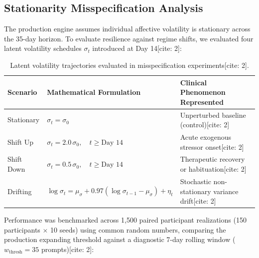 \documentclass[11pt,letterpaper]{article}
\begin{document}
\subsection{Stationarity Misspecification Analysis}

The production engine assumes individual affective volatility is stationary across the 35-day horizon. To evaluate resilience against regime shifts, we evaluated four latent volatility schedules $\sigma_t$ introduced at Day 14[cite: 2]:

\begin{table}[htbp]
\centering
\small
\begin{tabular}{@{}lll@{}}
\toprule
\textbf{Scenario} & \textbf{Mathematical Formulation} & \textbf{Clinical Phenomenon Represented} \\
\midrule
Stationary & $\sigma_t = \sigma_0$ & Unperturbed baseline (control)[cite: 2] \\
Shift Up & $\sigma_t = 2.0\,\sigma_0, \quad t \ge \text{Day } 14$ & Acute exogenous stressor onset[cite: 2] \\
Shift Down & $\sigma_t = 0.5\,\sigma_0, \quad t \ge \text{Day } 14$ & Therapeutic recovery or habituation[cite: 2] \\
Drifting & $\log \sigma_t = \mu_\sigma + 0.97(\log \sigma_{t-1} - \mu_\sigma) + \eta_t$ & Stochastic non-stationary variance drift[cite: 2] \\
\bottomrule
\end{tabular}
\caption{Latent volatility trajectories evaluated in misspecification experiments[cite: 2].}
\end{table}

Performance was benchmarked across 1,500 paired participant realizations (150 participants $\times$ 10 seeds) using common random numbers, comparing the production expanding threshold against a diagnostic 7-day rolling window ($w_{\text{thresh}} = 35$ prompts)[cite: 2]:
\end{document}
